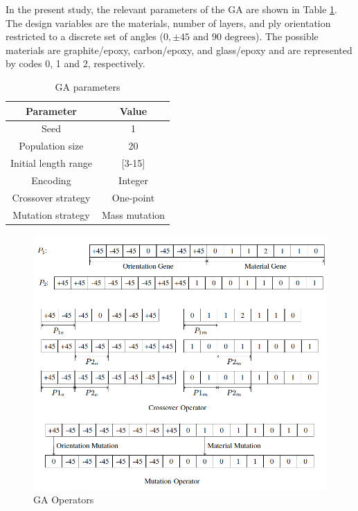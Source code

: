 \documentclass[USenglish,twocolumn]{article}
\begin{document}
In the present study, the relevant parameters of the GA are shown in Table \ref{tab:ga}. The design
variables are the materials, number of layers, and ply orientation restricted to a discrete set of
angles ($0,\pm 45 \text{ and } 90 \text{ degrees} $). The possible materials are graphite/epoxy,
carbon/epoxy, and glass/epoxy and are represented by codes 0, 1 and 2, respectively.


\begin{table}[h]
\centering
\caption{GA parameters}
\begin{adjustbox}{width=0.45\textwidth}
\label{tab:ga}
\begin{tabular}{cc}
\toprule
Parameter				&  Value  \\
\midrule
Seed					& 1       \\
Population size			& 20      \\
Initial length range	& [3-15]  \\
Encoding				& Integer  \\
Crossover strategy		& One-point \\
Mutation strategy		& Mass mutation \\
\bottomrule
\end{tabular}
\end{adjustbox}
\end{table}

\begin{figure}[!hbt]
  \includegraphics[width=\linewidth]{A_laminate_design_images/ga_operator.png}
\caption{GA Operators\label{GA:operator}}
\end{figure}
\end{document}
